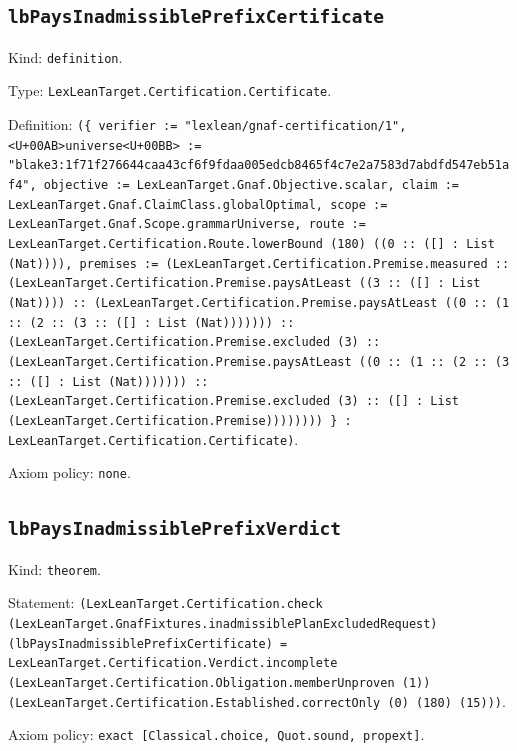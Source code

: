 \documentclass[11pt]{article}
\begin{document}
\subsection*{\texttt{lbPaysInadmissiblePrefixCertificate}}
\noindent Kind: \texttt{definition}.\par
\noindent Type: \texttt{LexLeanTarget.Certification.Certificate}.\par
\noindent Definition: \texttt{(\{ verifier := "lexlean/gnaf-certification/1", <U+00AB>universe<U+00BB> := "blake3:1f71f276644caa43cf6f9fdaa005edcb8465f4c7e2a7583d7abdfd547eb51af4", objective := LexLeanTarget.Gnaf.Objective.scalar, claim := LexLeanTarget.Gnaf.ClaimClass.globalOptimal, scope := LexLeanTarget.Gnaf.Scope.grammarUniverse, route := LexLeanTarget.Certification.Route.lowerBound (180) ((0 :: ([] : List (Nat)))), premises := (LexLeanTarget.Certification.Premise.measured :: (LexLeanTarget.Certification.Premise.paysAtLeast ((3 :: ([] : List (Nat)))) :: (LexLeanTarget.Certification.Premise.paysAtLeast ((0 :: (1 :: (2 :: (3 :: ([] : List (Nat))))))) :: (LexLeanTarget.Certification.Premise.excluded (3) :: (LexLeanTarget.Certification.Premise.paysAtLeast ((0 :: (1 :: (2 :: (3 :: ([] : List (Nat))))))) :: (LexLeanTarget.Certification.Premise.excluded (3) :: ([] : List (LexLeanTarget.Certification.Premise)))))))) \} : LexLeanTarget.Certification.Certificate)}.\par
\noindent Axiom policy: \texttt{none}.\par
\subsection*{\texttt{lbPaysInadmissiblePrefixVerdict}}
\noindent Kind: \texttt{theorem}.\par
\noindent Statement: \texttt{(LexLeanTarget.Certification.check (LexLeanTarget.GnafFixtures.inadmissiblePlanExcludedRequest) (lbPaysInadmissiblePrefixCertificate) = LexLeanTarget.Certification.Verdict.incomplete (LexLeanTarget.Certification.Obligation.memberUnproven (1)) (LexLeanTarget.Certification.Established.correctOnly (0) (180) (15)))}.\par
\noindent Axiom policy: \texttt{exact [Classical.choice, Quot.sound, propext]}.\par
\end{document}
